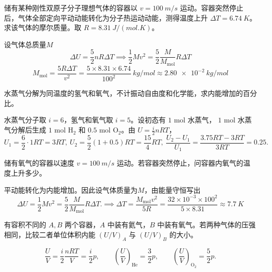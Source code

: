 \documentclass[lang=cn,11pt]{elegantbook}
\begin{document}
\begin{exercise}[由骤停温升反推刚性双原子气体摩尔质量]
储有某种刚性双原子分子理想气体的容器以 \(v=\SI{100}{m/s}\) 运动。容器突然停止后，气体全部定向平动动能转化为分子热运动动能，测得温度上升 \(\Delta T=\SI{6.74}{K}\)。求该气体的摩尔质量。取 \(R=\SI{8.31}{J/(mol.K)}\)。
\end{exercise}

\begin{solution}
设气体总质量$M$\[\Delta U=\frac52 nR\Delta T\implies\frac12 Mv^2=\frac52\frac{M}{M_{\mathrm{mol}}}R\Delta T\]
 \[M_{\mathrm{mol}} =\frac{5R\Delta T}{v^2} =\frac{5\times 8.31\times 6.74}{100^2}\ \si{kg/mol} \approx \SI{2.80e-2}{kg/mol}\]
\end{solution}

\begin{exercise}[水蒸气分解为同温氢气和氧气时内能增加多少]
水蒸气分解为同温度的氢气和氧气，不计振动自由度和化学能，求内能增加的百分比。
\end{exercise}

\begin{solution}
水蒸气分子取 \(i=6\)，氢气和氧气取 \(i=5\)。设初态有 \(1\) mol 水蒸气， \(1\) mol 水蒸气分解后生成 \(1\) mol \(\mathrm{H_2}\) 和 \(0.5\) mol \(\mathrm{O_2}\)。由 \(U=\frac{i}{2}nRT\)，
 \[U_1=\frac{6}{2}\cdot1RT=3RT,~ U_2=\frac{5}{2}(1+0.5)RT=\frac{15}{4}RT,~\frac{U_2-U_1}{U_1} =\frac{3.75RT-3RT}{3RT} =0.25.\] 
\end{solution}

\begin{exercise}[容器骤停后温升为什么先看整体平动动能去哪了]
储有氧气的容器以速度 \(v=\SI{100}{m/s}\) 运动。若容器突然停止，问容器内氧气的温度上升多少。
\end{exercise}

\begin{solution}
平动能转化为内能增加。因此设气体质量为$M$，由能量守恒写出
 \[\Delta U=\frac12 Mv^2=\frac52 \frac{M}{M_{\mathrm{mol}}}R\Delta T. \implies \Delta T=\frac{M_{\mathrm{mol}}v^2}{5R}=\frac{32\times10^{-3}\times 100^2}{5\times 8.31}\approx \SI{7.7}{K}\]
\end{solution}


\begin{exercise}
有容积不同的 \(A,B\) 两个容器，\(A\) 中装有氦气，\(B\) 中装有氧气。若两种气体的压强相同，比较二者单位体积内能 \((U/V)_A\) 与 \((U/V)_B\) 的大小。
\end{exercise}

\begin{solution}
 \[\frac{U}{V}=\frac{i}{2}\frac{nRT}{V}=\frac{i}{2}p,\qquad \left(\frac{U}{V}\right)_{\mathrm{He}}=\frac32p,\qquad \left(\frac{U}{V}\right)_{\mathrm{O_2}}=\frac52p.\]
\end{solution}
\end{document}
